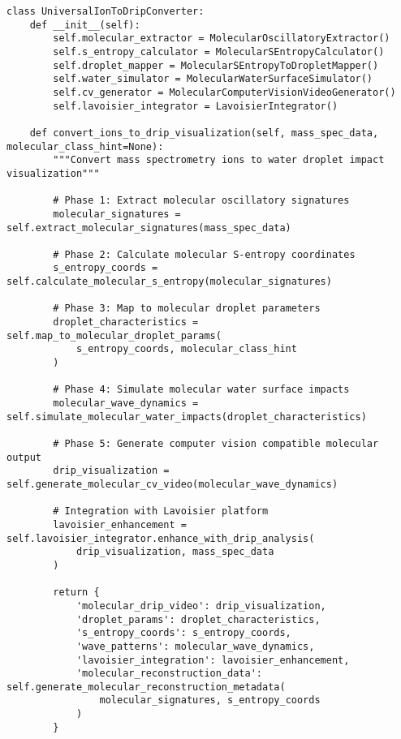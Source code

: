 \documentclass[12pt,a4paper]{article}
\begin{document}
\begin{lstlisting}[style=pythonstyle, caption=Core Ion-to-Drip Implementation for Mass Spectrometry]
class UniversalIonToDripConverter:
    def __init__(self):
        self.molecular_extractor = MolecularOscillatoryExtractor()
        self.s_entropy_calculator = MolecularSEntropyCalculator()
        self.droplet_mapper = MolecularSEntropyToDropletMapper()
        self.water_simulator = MolecularWaterSurfaceSimulator()
        self.cv_generator = MolecularComputerVisionVideoGenerator()
        self.lavoisier_integrator = LavoisierIntegrator()
        
    def convert_ions_to_drip_visualization(self, mass_spec_data, molecular_class_hint=None):
        """Convert mass spectrometry ions to water droplet impact visualization"""
        
        # Phase 1: Extract molecular oscillatory signatures
        molecular_signatures = self.extract_molecular_signatures(mass_spec_data)
        
        # Phase 2: Calculate molecular S-entropy coordinates
        s_entropy_coords = self.calculate_molecular_s_entropy(molecular_signatures)
        
        # Phase 3: Map to molecular droplet parameters
        droplet_characteristics = self.map_to_molecular_droplet_params(
            s_entropy_coords, molecular_class_hint
        )
        
        # Phase 4: Simulate molecular water surface impacts
        molecular_wave_dynamics = self.simulate_molecular_water_impacts(droplet_characteristics)
        
        # Phase 5: Generate computer vision compatible molecular output
        drip_visualization = self.generate_molecular_cv_video(molecular_wave_dynamics)
        
        # Integration with Lavoisier platform
        lavoisier_enhancement = self.lavoisier_integrator.enhance_with_drip_analysis(
            drip_visualization, mass_spec_data
        )
        
        return {
            'molecular_drip_video': drip_visualization,
            'droplet_params': droplet_characteristics,
            's_entropy_coords': s_entropy_coords,
            'wave_patterns': molecular_wave_dynamics,
            'lavoisier_integration': lavoisier_enhancement,
            'molecular_reconstruction_data': self.generate_molecular_reconstruction_metadata(
                molecular_signatures, s_entropy_coords
            )
        }
    

\end{lstlisting}
\end{document}
